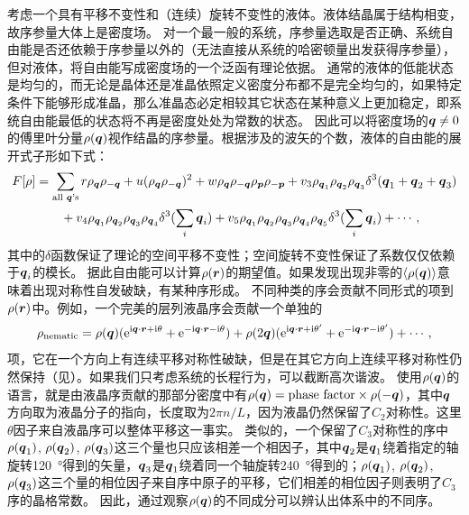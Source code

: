 \documentclass[hyperref, UTF8, a4paper]{ctexart}
\newcommand*{\ii}{\mathrm{i}}
\newcommand*{\ee}{\mathrm{e}}
\begin{document}
考虑一个具有平移不变性和（连续）旋转不变性的液体。液体结晶属于结构相变，故序参量大体上是密度场。
对一个最一般的系统，序参量选取是否正确、系统自由能是否还依赖于序参量以外的（无法直接从系统的哈密顿量出发获得序参量），但对液体，将自由能写成密度场的一个泛函有理论依据\cite{Evans_2016,cdft2020}。
通常的液体的低能状态是均匀的，而无论是晶体还是准晶依照定义密度分布都不是完全均匀的，如果特定条件下能够形成准晶，那么准晶态必定相较其它状态在某种意义上更加稳定，即系统自由能最低的状态将不再是密度处处为常数的状态。
因此可以将密度场的$\vb*{q} \neq 0$的傅里叶分量$\rho(\vb*{q})$视作结晶的序参量。根据涉及的波矢的个数，液体的自由能的展开式子形如下式：
\begin{equation}
    \begin{aligned}
        F[\rho] &= \sum_\text{all $\vb*{q}$'s} r \rho_{\vb*{q}} \rho_{- \vb*{q}} + u (\rho_{\vb*{q}} \rho_{- \vb*{q}})^2 
        + w \rho_{\vb*{q}} \rho_{- \vb*{q}} \rho_{\vb*{p}} \rho_{- \vb*{p}} 
        + v_3 \rho_{\vb*{q}_1} \rho_{\vb*{q}_2} \rho_{\vb*{q}_3} \delta^3(\vb*{q}_1 + \vb*{q}_2 + \vb*{q}_3) \\
        &\quad \quad + v_4 \rho_{\vb*{q}_1} \rho_{\vb*{q}_2} \rho_{\vb*{q}_3} \rho_{\vb*{q}_4} \delta^3(\sum_i \vb*{q}_i) 
        + v_5 \rho_{\vb*{q}_1} \rho_{\vb*{q}_2} \rho_{\vb*{q}_3} \rho_{\vb*{q}_4} \rho_{\vb*{q}_5}
        \delta^3(\sum_i \vb*{q}_i) + \cdots,
    \end{aligned}
    \label{eq:free-energy-static}
\end{equation}
其中的$\delta$函数保证了理论的空间平移不变性；空间旋转不变性保证了系数仅仅依赖于$\vb*{q}_i$的模长。
据此自由能可以计算$\rho(\vb*{r})$的期望值。如果发现出现非零的$\expval{\rho(\vb*{q})}$意味着出现对称性自发破缺，有某种序形成。
不同种类的序会贡献不同形式的项到$\rho(\vb*{r})$中。例如，一个完美的层列液晶序会贡献一个单独的
\begin{equation}
    \rho_\text{nematic} = \rho(\vb*{q}) (\ee^{\ii \vb*{q} \cdot \vb*{r} + \ii \theta } + \ee^{- \ii \vb*{q} \cdot \vb*{r} - \ii \theta } ) + \rho(2\vb*{q}) (\ee^{\ii \vb*{q} \cdot \vb*{r} + \ii \theta' } + \ee^{- \ii \vb*{q} \cdot \vb*{r} - \ii \theta' } ) + \cdots,
\end{equation}
项，它在一个方向上有连续平移对称性破缺，但是在其它方向上连续平移对称性仍然保持（见）。如果我们只考虑系统的长程行为，可以截断高次谐波。
使用$\rho(\vb*{q})$的语言，就是由液晶序贡献的那部分密度中有$\rho(\vb*{q}) = \text{phase factor} \times \rho(-\vb*{q})$，其中$\vb*{q}$方向取为液晶分子的指向，长度取为$2\pi n/ L$，因为液晶仍然保留了$C_2$对称性。这里$\theta$因子来自液晶序可以整体平移这一事实。
类似的，一个保留了$C_3$对称性的序中$\rho(\vb*{q}_1)$, $\rho(\vb*{q}_2)$, $\rho(\vb*{q}_3)$这三个量也只应该相差一个相因子，其中$\vb*{q}_2$是$\vb*{q}_1$绕着指定的轴旋转\SI{120}{\degree}得到的矢量，$\vb*{q}_3$是$\vb*{q}_1$绕着同一个轴旋转\SI{240}{\degree}得到的；$\rho(\vb*{q}_1)$, $\rho(\vb*{q}_2)$, $\rho(\vb*{q}_3)$这三个量的相位因子来自序中原子的平移，它们相差的相位因子则表明了$C_3$序的晶格常数。
因此，通过观察$\rho(\vb*{q})$的不同成分可以辨认出体系中的不同序。
\end{document}
